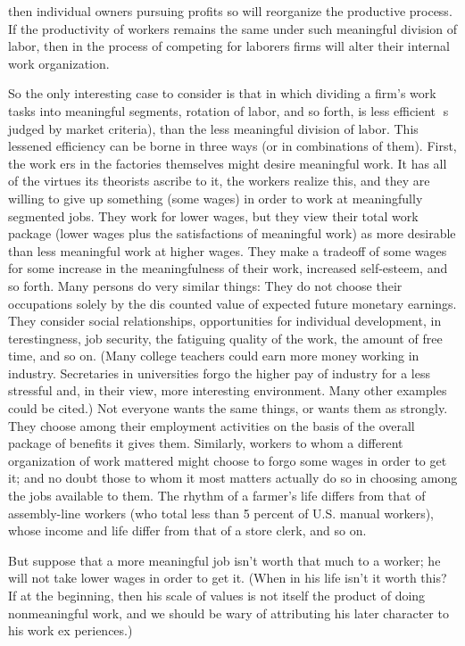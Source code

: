 \documentclass[11pt,openany]{book}
\begin{document}
then individual owners pursuing profits so will reorganize the productive process. If the productivity of workers remains the same under such meaningful division of labor, then in the process of competing for laborers firms will alter their internal work organization. 

So the only interesting case to consider is that in which dividing a firm's work tasks into meaningful segments, rotation of labor, and so forth, is less efficient s judged by market criteria), than the less meaningful division of labor. This lessened efficiency can be borne in three ways (or in combinations of them). First, the work ers in the factories themselves might desire meaningful work. It has all of the virtues its theorists ascribe to it, the workers realize this, and they are willing to give up something (some wages) in order to work at meaningfully segmented jobs. They work for lower wages, but they view their total work package (lower wages plus the satisfactions of meaningful work) as more desirable than less meaningful work at higher wages. They make a tradeoff of some wages for some increase in the meaningfulness of their work, increased self-esteem, and so forth. Many persons do very similar things: They do not choose their occupations solely by the dis counted value of expected future monetary earnings. They consider social relationships, opportunities for individual development, in terestingness, job security, the fatiguing quality of the work, the amount of free time, and so on. (Many college teachers could earn more money working in industry. Secretaries in universities forgo the higher pay of industry for a less stressful and, in their view, more interesting environment. Many other examples could be cited.) Not everyone wants the same things, or wants them as strongly. They choose among their employment activities on the basis of the overall package of benefits it gives them. Similarly, workers to whom a different organization of work mattered might choose to forgo some wages in order to get it; and no doubt those to whom it most matters actually do so in choosing among the jobs available to them. The rhythm of a farmer's life differs from that of assembly-line workers (who total less than 5 percent of U.S. manual workers), whose income and life differ from that of a store clerk, and so on. 

But suppose that a more meaningful job isn't worth that much to a worker; he will not take lower wages in order to get it. (When in his life isn't it worth this? If at the beginning, then his scale of values is not itself the product of doing nonmeaningful work, and we should be wary of attributing his later character to his work ex periences.) 
\end{document}
